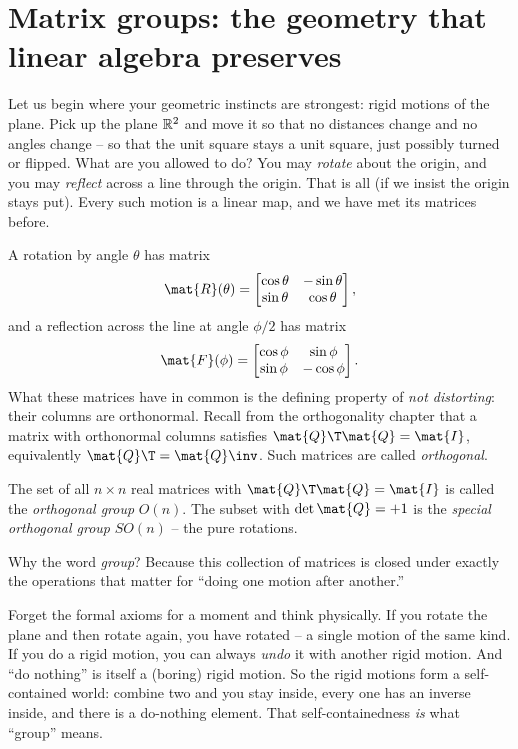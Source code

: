 \section{Matrix groups: the geometry that linear algebra preserves}
\label{ch37:groups}

Let us begin where your geometric instincts are strongest: rigid motions of the
plane. Pick up the plane $\mathbb{R}^2$ and move it so that no distances change and no
angles change -- so that the unit square stays a unit square, just possibly turned
or flipped. What are you allowed to do? You may \emph{rotate} about the origin, and
you may \emph{reflect} across a line through the origin. That is all (if we insist
the origin stays put). Every such motion is a linear map, and we have met its
matrices before.

A rotation by angle $\theta$ has matrix
\[
  \mat{R}(\theta)=\begin{bmatrix}\cos\theta & -\sin\theta\\ \sin\theta & \cos\theta\end{bmatrix},
\]
and a reflection across the line at angle $\phi/2$ has matrix
\[
  \mat{F}(\phi)=\begin{bmatrix}\cos\phi & \sin\phi\\ \sin\phi & -\cos\phi\end{bmatrix}.
\]
What these matrices have in common is the defining property of \emph{not distorting}:
their columns are orthonormal. Recall from the orthogonality chapter that a matrix
with orthonormal columns satisfies $\mat{Q}\T\mat{Q}=\mat{I}$, equivalently
$\mat{Q}\T=\mat{Q}\inv$. Such matrices are called \emph{orthogonal}.

\begin{definition}
\label{ch37:def-on}
The set of all $n\times n$ real matrices with $\mat{Q}\T\mat{Q}=\mat{I}$ is called
the \emph{orthogonal group} $O(n)$. The subset with $\det\mat{Q}=+1$ is the
\emph{special orthogonal group} $SO(n)$ -- the pure rotations.
\end{definition}

Why the word \emph{group}? Because this collection of matrices is closed under
exactly the operations that matter for ``doing one motion after another.''

\begin{intuitionbox}
Forget the formal axioms for a moment and think physically. If you rotate the plane
and then rotate again, you have rotated -- a single motion of the same kind. If you
do a rigid motion, you can always \emph{undo} it with another rigid motion. And
``do nothing'' is itself a (boring) rigid motion. So the rigid motions form a
self-contained world: combine two and you stay inside, every one has an inverse
inside, and there is a do-nothing element. That self-containedness \emph{is} what
``group'' means.
\end{intuitionbox}

